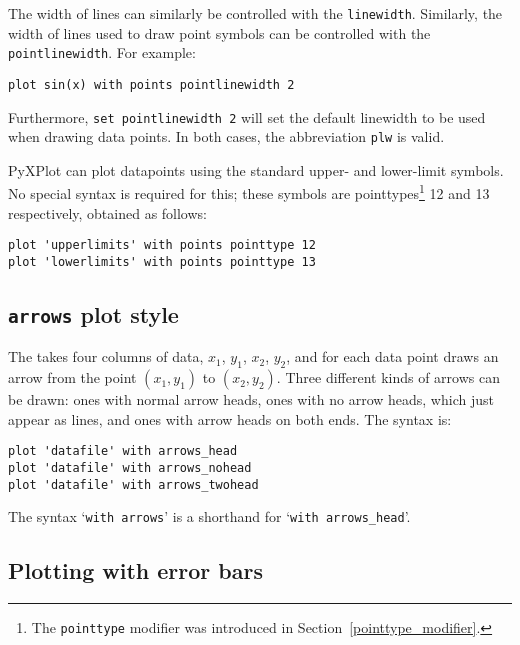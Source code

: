 The width of lines can similarly be controlled with the
\texttt{linewidth}.
Similarly, the width of lines used to draw point symbols can be controlled with
the \texttt{pointlinewidth}.  For example:

\begin{verbatim}
plot sin(x) with points pointlinewidth 2
\end{verbatim}

\noindent
Furthermore, \texttt{set pointlinewidth 2} will set the default linewidth to be
used when drawing data points.  In both cases, the abbreviation \texttt{plw} is
valid. 

PyXPlot can plot datapoints using the
standard upper- and lower-limit symbols. No special syntax is required for
this; these symbols are pointtypes\footnote{The \texttt{pointtype} modifier was
introduced in Section~\ref{pointtype_modifier}.} 12 and 13 respectively,
obtained as follows:

\begin{verbatim}
plot 'upperlimits' with points pointtype 12
plot 'lowerlimits' with points pointtype 13
\end{verbatim}

\subsection{\texttt{arrows} plot style}
\label{arrows_plot_style} 

The 
takes four columns of data, $x_1$, $y_1$, $x_2$, $y_2$, and for each data point
draws an arrow from the point $(x_1,y_1)$ to $(x_2,y_2)$.  Three different kinds
of arrows can be drawn: ones with normal arrow heads, ones with no arrow heads,
which just appear as lines, and ones with arrow heads on both ends. The syntax
is:

\begin{verbatim}
plot 'datafile' with arrows_head
plot 'datafile' with arrows_nohead
plot 'datafile' with arrows_twohead
\end{verbatim}

The syntax `\texttt{with arrows}' is a shorthand for `\texttt{with arrows\_head}'.


\subsection{Plotting with error bars}

